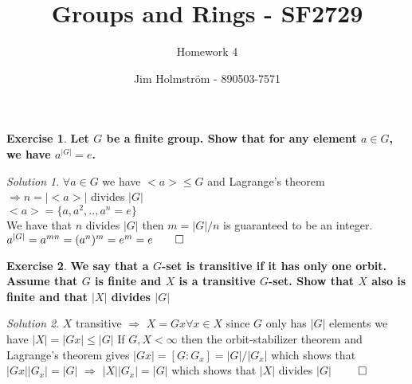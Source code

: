 \documentclass[a4paper,twoside=false,abstract=false,numbers=noenddot,
titlepage=false,headings=small,parskip=half,version=last]{scrartcl}
\author{Jim Holmström - 890503-7571}
\title{Groups and Rings - SF2729}
\subtitle{Homework 4}
\theoremstyle{definition}
\newtheorem{exercise}{Exercise}
\theoremstyle{remark}
\newtheorem*{solution}{Solution}
\begin{document}
\maketitle
\thispagestyle{empty}

\begin{exercise}
{\bf
Let $G$ be a finite group. Show that for any element $a \in G$, we have $a^{|G|}=e$.
}
\end{exercise}
\begin{solution}
$\forall a \in G$ we have $<a> \le G$ and Lagrange's theorem $\Rightarrow n=|<a>|$ divides $|G|$ \\
$<a>=\{a,a^2,..,a^n=e\}$ \\
We have that $n$ divides $|G|$ then $m=|G|/n$ is guaranteed to be an integer.\\
$a^{|G|}=a^{mn}=(a^{n})^m=e^m=e \qed$


\end{solution}

\begin{exercise}
{\bf
We say that a $G$-set is transitive if it has only one orbit. Assume that $G$ is finite and $X$ is a transitive $G$-set. Show that $X$ also is finite and that $|X|$ divides $|G|$
}
\end{exercise}
\begin{solution}
$X$ transitive $\Rightarrow$ $X=Gx \forall x \in X$ since $G$ only has $|G|$ elements we have $|X|=|Gx| \le |G|$
If $G,X < \infty$ then the orbit-stabilizer theorem and Lagrange's theorem gives 
$|Gx|=\left[ G : G_x \right] =|G|/|G_x|$ which shows that $|Gx||G_x|=|G|$ 
$\Rightarrow$ $|X||G_x|=|G|$ which shows that $|X|$ divides $|G|$ $\qed$
\end{solution}


\end{document}
